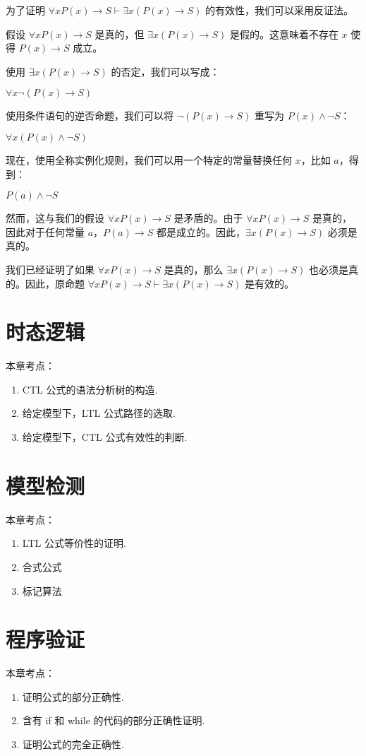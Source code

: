 \documentclass[cn, hazy, blue, normal, 12pt]{elegantnote}
\begin{document}
\begin{solution}[print=true]

    为了证明 $\forall x P(x) \rightarrow S \vdash \exists x(P(x) \rightarrow S)$ 的有效性，我们可以采用反证法。

    假设 $\forall x P(x) \rightarrow S$ 是真的，但 $\exists x(P(x) \rightarrow S)$ 是假的。这意味着不存在 $x$ 使得 $P(x) \rightarrow S$ 成立。

    使用 $\exists x(P(x) \rightarrow S)$ 的否定，我们可以写成：

    $\forall x \neg (P(x) \rightarrow S)$

    使用条件语句的逆否命题，我们可以将 $\neg (P(x) \rightarrow S)$ 重写为 $P(x) \land \neg S$：

    $\forall x (P(x) \land \neg S)$

    现在，使用全称实例化规则，我们可以用一个特定的常量替换任何 $x$，比如 $a$，得到：

    $P(a) \land \neg S$

    然而，这与我们的假设 $\forall x P(x) \rightarrow S$ 是矛盾的。由于 $\forall x P(x) \rightarrow S$ 是真的，因此对于任何常量 $a$，$P(a) \rightarrow S$ 都是成立的。因此，$\exists x(P(x) \rightarrow S)$ 必须是真的。

    我们已经证明了如果 $\forall x P(x) \rightarrow S$ 是真的，那么 $\exists x(P(x) \rightarrow S)$ 也必须是真的。因此，原命题 $\forall x P(x) \rightarrow S \vdash \exists x(P(x) \rightarrow S)$ 是有效的。

\end{solution}


\section{时态逻辑}

本章考点：

\begin{enumerate}
    \item CTL 公式的语法分析树的构造.
    \item 给定模型下，LTL 公式路径的选取.
    \item 给定模型下，CTL 公式有效性的判断.
\end{enumerate}

\section{模型检测}

本章考点：

\begin{enumerate}
    \item LTL 公式等价性的证明.
    \item 合式公式
    \item 标记算法
\end{enumerate}

\section{程序验证}

本章考点：

\begin{enumerate}
    \item 证明公式的部分正确性.
    \item 含有 if 和 while 的代码的部分正确性证明.
    \item 证明公式的完全正确性.
\end{enumerate}
\end{document}
